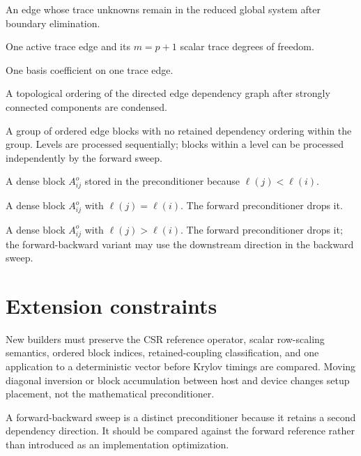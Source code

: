\documentclass[11pt]{article}
\newcommand{\level}{\ell}
\begin{document}
\begin{description}[leftmargin=2.8cm,style=nextline]
  \item[Active trace edge]
  An edge whose trace unknowns remain in the reduced global system after
  boundary elimination.

  \item[Block]
  One active trace edge and its \(m=p+1\) scalar trace degrees of freedom.

  \item[Scalar dof]
  One basis coefficient on one trace edge.

  \item[Upwind-SCC ordering]
  A topological ordering of the directed edge dependency graph after strongly
  connected components are condensed.

  \item[Level]
  A group of ordered edge blocks with no retained dependency ordering within
  the group.  Levels are processed sequentially; blocks within a level can be
  processed independently by the forward sweep.

  \item[Retained upstream coupling]
  A dense block \(A^o_{ij}\) stored in the preconditioner because
  \(\level(j)<\level(i)\).

  \item[Same-level coupling]
  A dense block \(A^o_{ij}\) with \(\level(j)=\level(i)\).  The forward
  preconditioner drops it.

  \item[Downstream coupling]
  A dense block \(A^o_{ij}\) with \(\level(j)>\level(i)\).  The forward
  preconditioner drops it; the forward-backward variant may use the downstream
  direction in the backward sweep.
\end{description}

\section{Extension constraints}

New builders must preserve the CSR reference operator, scalar row-scaling
semantics, ordered block indices, retained-coupling classification, and one
application to a deterministic vector before Krylov timings are compared.
Moving diagonal inversion or block accumulation between host and device changes
setup placement, not the mathematical preconditioner.

A forward-backward sweep is a distinct preconditioner because it retains a
second dependency direction. It should be compared against the forward
reference rather than introduced as an implementation optimization.
\end{document}
